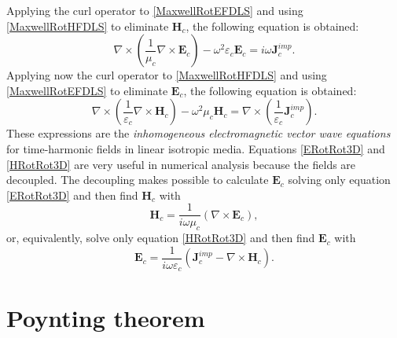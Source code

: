 Applying the curl operator to \eqref{MaxwellRotEFDLS} and using \eqref{MaxwellRotHFDLS} to eliminate $\mathbf{H}_{c}$, the following equation is obtained:
\begin{equation}\label{ERotRot3D}
	\nabla\times\left(\frac{1}{\mu_{c}}\nabla\times\mathbf{E}_{c}\right) - \omega^{2}\varepsilon_{c}\mathbf{E}_{c} = i\omega\mathbf{J}_{c}^{imp}.
\end{equation}
Applying now the curl operator to \eqref{MaxwellRotHFDLS} and using \eqref{MaxwellRotEFDLS} to eliminate $\mathbf{E}_{c}$, the following equation is obtained:
\begin{equation}\label{HRotRot3D}
    \nabla\times\left(\frac{1}{\varepsilon_{c}}\nabla\times\mathbf{H}_{c}\right) - \omega^{2}\mu_{c}\mathbf{H}_{c} = \nabla\times \left(\frac{1}{\varepsilon_{c}}\mathbf{J}_{c}^{imp}\right).
\end{equation}
These expressions are the \emph{inhomogeneous electromagnetic vector wave equations} for time-harmo\-nic fields in linear isotropic media. Equations \eqref{ERotRot3D} and \eqref{HRotRot3D} are very useful in numerical analysis because the fields are decoupled. The decoupling makes possible to calculate $\mathbf{E}_{c}$ solving only equation \eqref{ERotRot3D} and then find $\mathbf{H}_{c}$ with
\begin{equation}\label{FindHfromE}
	\mathbf{H}_{c} = \frac{1}{i\omega\mu_{c}}\left(\nabla\times\mathbf{E}_{c}\right),
\end{equation}
or, equivalently, solve only equation \eqref{HRotRot3D} and then find $\mathbf{E}_{c}$ with
\begin{equation}\label{FindEfromH}
	\mathbf{E}_{c} = \frac{1}{i\omega\varepsilon_{c}}\left(\mathbf{J}_{c}^{imp} - \nabla\times\mathbf{H}_{c}\right).
\end{equation}

\section{Poynting theorem}

